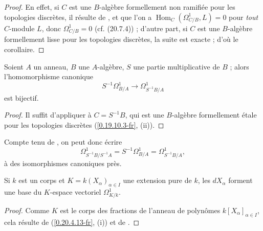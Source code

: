 \begin{proof}
En effet, si $C$ est une $B$-algèbre formellement non ramifiée pour les
topologies discrètes, il résulte de ,
 et  que l'on a
$\operatorname{Hom}_C(\Omega^1_{C/B},L)=0$ pour \emph{tout} $C$-module $L$, donc
$\Omega^1_{C/B}=0$ (cf. (20.7.4)) ; d'autre part, si $C$ est une
$B$-algèbre formellement lisse pour les topologies discrètes, la suite
 est exacte ; d'où le corollaire.
\end{proof}

\begin{corollary}[20.5.9]
\label{0.20.5.9-fr}
Soient $A$ un anneau, $B$ une $A$-algèbre, $S$ une partie multiplicative de
$B$ ; alors l'homomorphisme canonique
\begin{equation}
\tag{20.5.9.1}
\label{0.20.5.9.1-fr}
  S^{-1}\Omega^1_{B/A}\to\Omega^1_{S^{-1}B/A}
\end{equation}
est bijectif.
\end{corollary}

\begin{proof}
Il suffit d'appliquer  à $C=S^{-1}B$, qui est une
$B$-algèbre formellement étale pour les topologies discrètes
(\ref{0.19.10.3-fr}, (ii)).
\end{proof}

Compte tenu de , on peut donc écrire
\begin{equation}
\tag{20.5.9.2}
\label{0.20.5.9.2-fr}
  \Omega^1_{S^{-1}B/S^{-1}A}
  =S^{-1}\Omega^1_{B/A}
  =\Omega^1_{S^{-1}B/A},
\end{equation}
à des isomorphismes canoniques près.

\begin{corollary}[20.5.10]
\label{0.20.5.10-fr}
Si $k$ est un corps et $K=k(X_\alpha)_{\alpha\in I}$ une extension pure de
$k$, les $dX_\alpha$ forment une base du $K$-espace vectoriel
$\Omega^1_{K/k}$.
\end{corollary}

\begin{proof}
Comme $K$ est le corps des fractions de l'anneau de polynômes
$k[X_\alpha]_{\alpha\in I}$, cela résulte de (\ref{0.20.4.13-fr}, (i)) et de
.
\end{proof}


